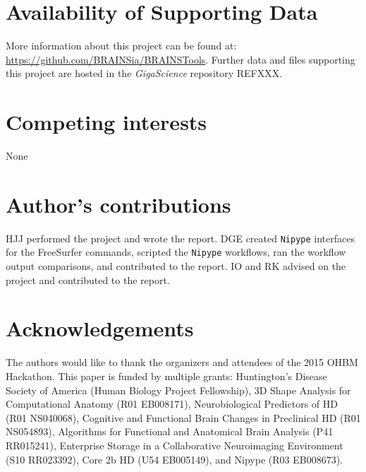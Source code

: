 \documentclass[twocolumn]{bmcart}%
\newcommand{\projURL}{https://github.com/BRAINSia/BRAINSTools}
\begin{document}
\begin{backmatter}

\section*{Availability of Supporting Data}
More information about this project can be found at: \url{\projURL}. Further data and files supporting this project are hosted in the \emph{GigaScience} repository REFXXX.

\section*{Competing interests}
None

\section*{Author's contributions}
HJJ performed the project and wrote the report.
DGE created \texttt{Nipype} interfaces for the FreeSurfer commands, scripted the \texttt{Nipype} workflows, ran the workflow output comparisons, and contributed to the report. IO and RK advised on the project and contributed to the report.

\section*{Acknowledgements}
The authors would like to thank the organizers and attendees of the 2015 OHBM Hackathon.
This paper is funded by multiple grants: Huntington’s Disease Society of America (Human Biology Project Fellowship),   3D Shape Analysis for Computational Anatomy (R01 EB008171), Neurobiological Predictors of HD (R01 NS040068), Cognitive and Functional Brain Changes in Preclinical HD (R01 NS054893), Algorithms for Functional and Anatomical Brain Analysis (P41 RR015241), Enterprise Storage in a Collaborative Neuroimaging Environment (S10 RR023392), Core 2b HD (U54 EB005149), and Nipype (R03 EB008673).



\end{backmatter}
\end{document}
